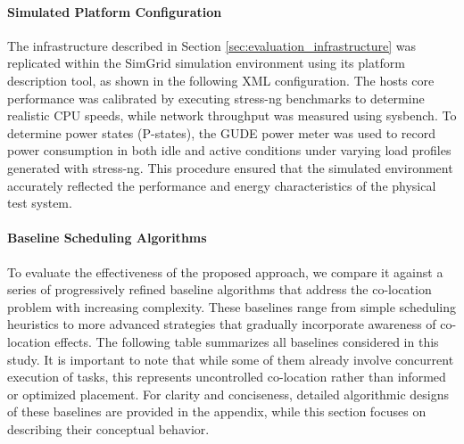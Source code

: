 \paragraph{Simulated Platform Configuration}
The infrastructure described in Section \ref{sec:evaluation_infrastructure} was replicated within the SimGrid simulation environment using its platform description tool, as shown in the following XML configuration. The hosts core performance was calibrated by executing stress-ng benchmarks to determine realistic CPU speeds, while network throughput was measured using sysbench. To determine power states (P-states), the GUDE power meter was used to record power consumption in both idle and active conditions under varying load profiles generated with stress-ng. This procedure ensured that the simulated environment accurately reflected the performance and energy characteristics of the physical test system.



\paragraph{Baseline Scheduling Algorithms}

To evaluate the effectiveness of the proposed approach, we compare it against a series of progressively refined baseline algorithms that address the co-location problem with increasing complexity. These baselines range from simple scheduling heuristics to more advanced strategies that gradually incorporate awareness of co-location effects. The following table summarizes all baselines considered in this study. It is important to note that while some of them already involve concurrent execution of tasks, this represents uncontrolled co-location rather than informed or optimized placement. For clarity and conciseness, detailed algorithmic designs of these baselines are provided in the appendix, while this section focuses on describing their conceptual behavior.

